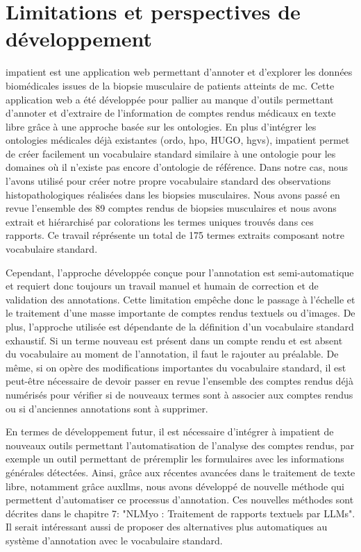 \section{Limitations et perspectives de développement}
\gls{impatient} est une application web permettant d'annoter et d'explorer les données biomédicales issues de la biopsie musculaire de patients atteints de \gls{mc}. Cette application web a été développée pour pallier au manque d'outils permettant d'annoter et d'extraire de l'information de comptes rendus médicaux en texte libre grâce à une approche basée sur les ontologies. En plus d'intégrer les ontologies médicales déjà existantes (\gls{ordo}, \gls{hpo}, HUGO, \gls{hgvs}), \gls{impatient} permet de créer facilement un vocabulaire standard similaire à une ontologie pour les domaines où il n'existe pas encore d'ontologie de référence. Dans notre cas, nous l'avons utilisé pour créer notre propre vocabulaire standard des observations histopathologiques réalisées dans les biopsies musculaires. Nous avons passé en revue l'ensemble des 89 comptes rendus de biopsies musculaires et nous avons extrait et hiérarchisé par colorations les termes uniques trouvés dans ces rapports. Ce travail réprésente un total de 175 termes extraits composant notre vocabulaire standard.


Cependant, l'approche développée conçue pour l'annotation est semi-automatique et requiert donc toujours un travail manuel et humain de correction et de validation des annotations. Cette limitation empêche donc le passage à l'échelle et le traitement d'une masse importante de comptes rendus textuels ou d'images. De plus, l'approche utilisée est dépendante de la définition d'un vocabulaire standard exhaustif. Si un terme nouveau est présent dans un compte rendu et est absent du vocabulaire au moment de l'annotation, il faut le rajouter au préalable. De même, si on opère des modifications importantes du vocabulaire standard, il est peut-être nécessaire de devoir passer en revue l'ensemble des comptes rendus déjà numérisés pour vérifier si de nouveaux termes sont à associer aux comptes rendus ou si d'anciennes annotations sont à supprimer.


En termes de développement futur, il est nécessaire d'intégrer à \gls{impatient}  de nouveaux outils permettant l'automatisation de l'analyse des comptes rendus, par exemple un outil permettant de préremplir les formulaires avec les informations générales détectées. Ainsi, grâce aux récentes avancées dans le traitement de texte libre, notamment grâce aux\gls{llms}, nous avons développé de nouvelle méthode qui permettent d'automatiser ce processus d'annotation. Ces nouvelles méthodes sont décrites dans le chapitre 7: "NLMyo : Traitement de rapports textuels par LLMs". Il serait intéressant aussi de proposer des alternatives plus automatiques au système d'annotation avec le vocabulaire standard.


